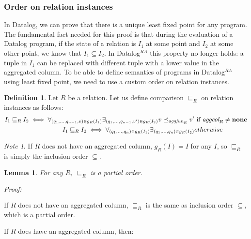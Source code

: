 \documentclass{pracamgr}
\theoremstyle{plain}
\newtheorem{lem}[thm]{Lemma}
\theoremstyle{definition}
\newtheorem{defn}{Definition}[section]
\theoremstyle{remark}
\newtheorem*{note}{Note}
\newcommand{\datalogra}{Datalog$^{RA}$ }
\newcommand{\aggfun}{\textit{aggfun} }
\newcommand{\aggcol}{\textit{aggcol} }
\begin{document}
\subsubsection{Order on relation instances}
In Datalog, we can prove that there is a unique least fixed point for any program. The fundamental fact needed for this proof is that during the evaluation of a Datalog program, if the state of a relation is $I_1$ at some point and $I_2$ at some other point, we know that $I_1 \subseteq I_2$. In \datalogra this property no longer holds: a tuple in $I_1$ can be replaced with different tuple with a lower value in the aggregated column. To be able to define semantics of programs in \datalogra using least fixed point, we need to use a custom order on relation instances.

\begin{defn}
Let $R$ be a relation. Let us define comparison $\sqsubseteq_R$ on relation instances as follows:
\begin{align}
I_1 \sqsubseteq_R I_2 \iff \forall_{(q_1, ..., q_{n-1}, v) \in g_R(I_1)} \exists_{(q_1, ..., q_{n-1}, v') \in g_R(I_2)} v \preceq_{\aggfun_R} v' & \text{ if } \aggcol_R \ne \bf{none} \\
I_1 \sqsubseteq_R I_2 \iff \forall_{(q_1, ..., q_n) \in g_R(I_1)} \exists_{(q_1, ..., q_n) \in g_R(I_2)} & otherwise
\end{align}
\end{defn}

\begin{note}
If $R$ does not have an aggregated column, $g_R(I) = I$ for any $I$, so $\sqsubseteq_R$ is simply the inclusion order $\subseteq$. 
\end{note}

\begin{lem}
For any $R$, $\sqsubseteq_R$ is a partial order.
\end{lem}

\emph{Proof:}

If $R$ does not have an aggregated column, $\sqsubseteq_R$ is the same as inclusion order $\subseteq$, which is a partial order.

If $R$ does have an aggregated column, then:
\end{document}
